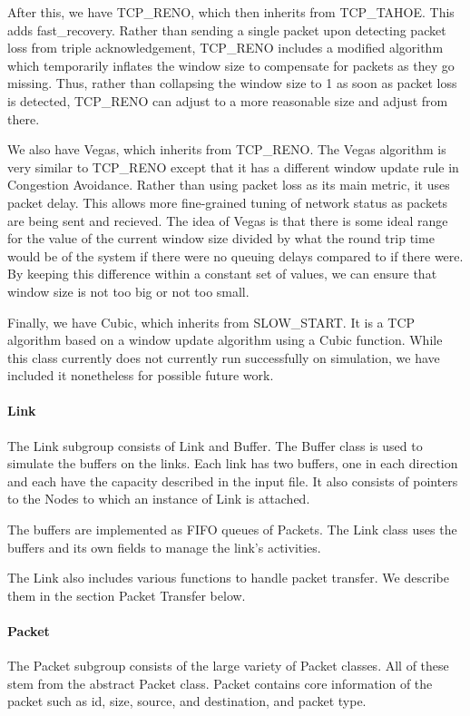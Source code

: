     After this, we have TCP\_RENO, which then inherits from TCP\_TAHOE. This adds fast\_recovery. Rather than sending a single packet upon detecting packet loss from triple acknowledgement, TCP\_RENO includes a modified algorithm which temporarily inflates the window size to compensate for packets as they go missing. Thus, rather than collapsing the window size to 1 as soon as packet loss is detected, TCP\_RENO can adjust to a more reasonable size and adjust from there. 
    
    We also have Vegas, which inherits from TCP\_RENO. The Vegas algorithm is very similar to TCP\_RENO except that it has a different window update rule in Congestion Avoidance. Rather than using packet loss as its main metric, it uses packet delay. This allows more fine-grained tuning of network status as packets are being sent and recieved. The idea of Vegas is that there is some ideal range for the value of the current window size divided by what the round trip time would be of the system if there were no queuing delays compared to if there were. By keeping this difference within a constant set of values, we can ensure that window size is not too big or not too small. 
    
    Finally, we have Cubic, which inherits from SLOW\_START. It is a TCP algorithm based on a window update algorithm using a Cubic function. While this class currently does not currently run successfully on simulation, we have included it nonetheless for possible future work. 
    

    \paragraph{Link} The Link subgroup consists of Link and Buffer. The Buffer class is used to simulate the buffers on the links. Each link has two buffers, one in each direction and each have the capacity described in the input file. It also consists of pointers to the Nodes to which an instance of Link is attached.
    
    The buffers are implemented as FIFO queues of Packets. The Link class uses the buffers and its own fields to manage the link’s activities. 

    The Link also includes various functions to handle packet transfer. We describe them in the section Packet Transfer below. 

    \paragraph{Packet} The Packet subgroup consists of the large variety of Packet classes. All of these stem from the abstract Packet class. Packet contains core information of the packet such as id, size, source, and destination, and packet type. 
    
